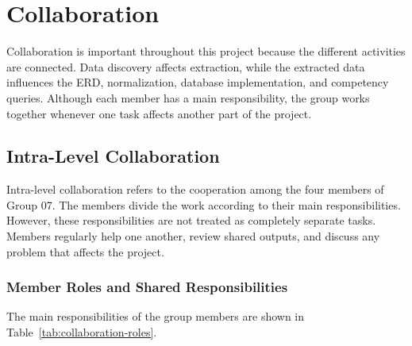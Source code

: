 \section{Collaboration}
\label{sec:collaboration}

Collaboration is important throughout this project because the different
activities are connected. Data discovery affects extraction, while the
extracted data influences the ERD, normalization, database implementation,
and competency queries. Although each member has a main responsibility,
the group works together whenever one task affects another part of the
project.

\subsection{Intra-Level Collaboration}
\label{subsec:intra-level-collaboration}

Intra-level collaboration refers to the cooperation among the four members
of Group 07. The members divide the work according to their main
responsibilities. However, these responsibilities are not treated as
completely separate tasks. Members regularly help one another, review
shared outputs, and discuss any problem that affects the project.

\subsubsection{Member Roles and Shared Responsibilities}

The main responsibilities of the group members are shown in
Table~\ref{tab:collaboration-roles}.

